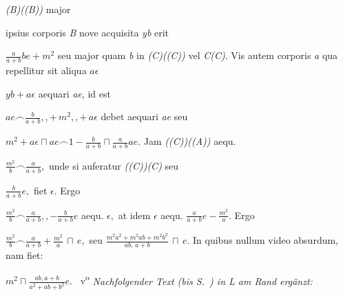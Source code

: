%
\textit{(B)((B))} major
\rule[-3mm]{0pt}{6mm}%
%
%
ipsius corporis \textit{B}
nove acquisita \textit{yb}%
\protect{}%
\protect{}
erit \rule[-3mm]{0pt}{6mm}%
$\displaystyle\frac{a}{a+b}be+m^2$
seu major quam \textit{b} in \textit{(C)((C))} vel \textit{C(C)}.
%
Vis autem corporis \textit{a}
qua repellitur%
\protect{}
sit aliqua $a\epsilon$
\rule[-3mm]{0pt}{6mm}%
%
%
$yb + a\epsilon$ aequari \textit{ae},
id est \rule[-3mm]{0pt}{6mm}%
$ae\smallfrown\displaystyle\frac{b}{a+b},\!, +\, m^2,\!, +\, a\epsilon$ debet aequari \textit{ae}
seu \rule[-3mm]{0pt}{6mm}%
$m^2+a\epsilon \sqcap ae\smallfrown1-\displaystyle\frac{b}{a+b}\sqcap \displaystyle\frac{a}{a+b}ae.$
%
Jam \textit{((C))((A))} aequ. \rule[-3mm]{0pt}{6mm}$\displaystyle\frac{m^2}{b}\smallfrown \displaystyle\frac{a}{a+b},$
unde si auferatur \textit{((C))(C)} seu \rule[-3mm]{0pt}{6mm}$\displaystyle\frac{b}{a+b}e,$
fiet $\epsilon.$
\quad
Ergo \rule[-3mm]{0pt}{0mm}%
$\displaystyle\frac{m^2}{b}\smallfrown\displaystyle\frac{a}{a+b},\!,-\displaystyle\frac{b}{a+b}e$ aequ. $\epsilon,$
at idem $\epsilon$ aequ.
$\displaystyle\frac{a}{a+b}e-\displaystyle\frac{m^2}{a}.$
%
Ergo \rule[-2mm]{0pt}{0mm}%
$\displaystyle\frac{m^2}{b} \smallfrown \displaystyle\frac{a}{a+b}+\displaystyle\frac{m^2}{a}\, \sqcap\, e,$
seu %
$\displaystyle\frac{m^2a^2+m^2ab+m^2b^2}{ab,\,a+b}\, \sqcap\, e.$
%
In quibus nullum video absurdum,%
\protect{}
nam fiet:
\rule[-0mm]{0pt}{5mm}%
$m^2\sqcap \displaystyle\frac{ab, a+b}{a^2+ab+b^2} e.$%
%
{\normalsize{~v\textsuperscript{o}\rbrack}}%
%
\pend%
\vspace{2.0em}%
%
\normalsize%
%
\pstart%
\noindent%
\lbrack\textit{Nachfolgender Text (bis S.~) in L am Rand ergänzt:}\rbrack\
\pend%
\vspace{0.5em}
%
\pstart%
\noindent%
